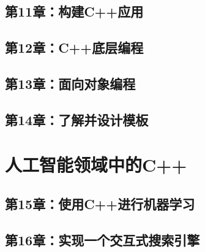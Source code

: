 \documentclass[11pt,a4paper,UTF8]{ctexart}
\begin{document}
		\subsection{第11章：构建C++应用}
			
		\subsection{第12章：C++底层编程}
			
		\subsection{第13章：面向对象编程}
			
		\subsection{第14章：了解并设计模板}
			
	\section{人工智能领域中的C++}
		
		\subsection{第15章：使用C++进行机器学习}
			
		\subsection{第16章：实现一个交互式搜索引擎}
			
\end{document}

